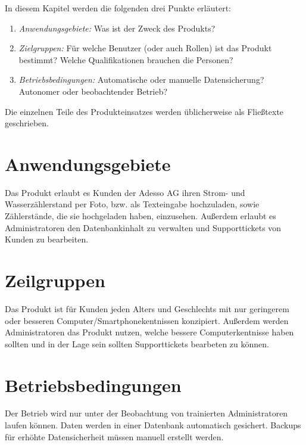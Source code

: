 \begin{tcolorbox}
In diesem Kapitel werden die folgenden drei Punkte erläutert:
\begin{enumerate}
	\item \textit{Anwendungsgebiete:} Was ist der Zweck des Produkts?
	\item \textit{Zielgruppen:} Für welche Benutzer (oder auch Rollen) ist das Produkt bestimmt?
	Welche Qualifikationen brauchen die Personen?
	\item \textit{Betriebsbedingungen:} Automatische oder manuelle Datensicherung? 	Autonomer oder beobachtender Betrieb? 	
\end{enumerate}

\noindent Die einzelnen Teile des Produkteinsatzes werden üblicherweise als Fließtexte geschrieben.
\end{tcolorbox}

\section{Anwendungsgebiete}

Das Produkt erlaubt es Kunden der Adesso AG ihren Strom- und Wasserzählerstand per Foto, bzw. als Texteingabe hochzuladen, sowie Zählerstände, die sie hochgeladen haben, einzusehen.
Außerdem erlaubt es Administratoren den Datenbankinhalt zu verwalten und Supporttickets von Kunden zu bearbeiten.

\section{Zeilgruppen}

Das Produkt ist für Kunden jeden Alters und Geschlechts mit nur geringerem oder besseren Computer/Smartphonekentnissen konzipiert.
Außerdem werden Administratoren das Produkt nutzen, welche bessere Computerkentnisse haben sollten und in der Lage sein sollten Supporttickets bearbeten zu können.

\section{Betriebsbedingungen}

Der Betrieb wird nur unter der Beobachtung von trainierten Administratoren laufen können. Daten werden in einer Datenbank automatisch gesichert. Backups für erhöhte Datensicherheit müssen manuell erstellt werden.